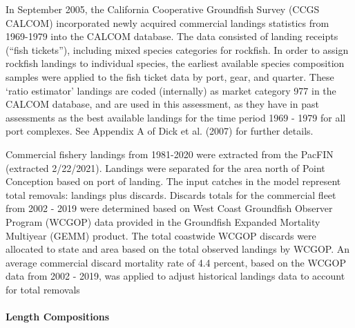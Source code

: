 \documentclass[11pt,
  english,
  a4paper,
]{article}
\begin{document}
In September 2005, the California Cooperative Groundfish Survey (CCGS CALCOM) incorporated newly acquired commercial landings statistics from 1969-1979 into the CALCOM database. The data consisted of landing receipts (``fish tickets''), including mixed species categories for rockfish. In order to assign rockfish landings to individual species, the earliest available species composition samples were applied to the fish ticket data by port, gear, and quarter. These `ratio estimator' landings are coded (internally) as market category 977 in the CALCOM database, and are used in this assessment, as they have in past assessments as the best available landings for the time period 1969 - 1979 for all port complexes. See Appendix A of Dick et al. {(2007)\leavevmode\tagmcend\tagstructend} for further details.

\leavevmode\tagmcend\tagstructend\par


Commercial fishery landings from 1981-2020 were extracted from the PacFIN (extracted 2/22/2021). Landings were separated for the area north of Point Conception based on port of landing. The input catches in the model represent total removals: landings plus discards. Discards totals for the commercial fleet from 2002 - 2019 were determined based on West Coast Groundfish Observer Program (WCGOP) data provided in the Groundfish Expanded Mortality Multiyear (GEMM) product. The total coastwide WCGOP discards were allocated to state and area based on the total observed landings by WCGOP. An average commercial discard mortality rate of 4.4 percent, based on the WCGOP data from 2002 - 2019, was applied to adjust historical landings data to account for total removals

\leavevmode\tagmcend\tagstructend\par


\hypertarget{length-compositions}{%
\paragraph{Length Compositions}\label{length-compositions}}

\leavevmode\tagmcend\tagstructend

\end{document}
